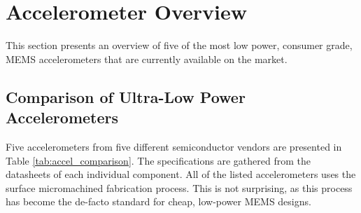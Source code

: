 \chapter{Accelerometer Overview}
\label{chap:overview}

This section presents an overview of five of the most low power, consumer grade, MEMS accelerometers that are currently available on the market.

\section{Comparison of Ultra-Low Power Accelerometers}

Five accelerometers from five different semiconductor vendors are presented in Table \ref{tab:accel_comparison}. The specifications are gathered from the datasheets of each individual component. All of the listed accelerometers uses the surface micromachined fabrication process. This is not surprising, as this process has become the de-facto standard for cheap, low-power MEMS designs.  

